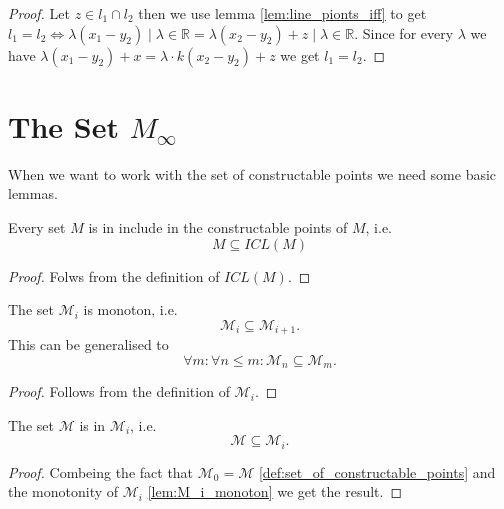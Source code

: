 \begin{proof}
    Let $z\in l_1 \cap l_2$ then we use lemma \ref{lem:line_pionts_iff} to get $l_1 = l_2 \Leftrightarrow {\lambda (x_1-y_2)\mid\lambda\in\mathbb{R}} = {\lambda (x_2- y_2)+z\mid\lambda\in\mathbb{R}}$.
    Since for every $\lambda$ we have $\lambda (x_1-y_2) + x = \lambda \cdot k(x_2- y_2)+z$ we get $l_1 = l_2$.
 \end{proof}

\section[The set of constructable points]{The Set $M_{\infty}$}\label{set_of_constructable_points}
When we want to work with the set of constructable points we need some basic lemmas.

\begin{lemma}
    \label{lem:M_in_ICL_M}
    \leanok
    Every set $M$ is in include in the constructable points of $M$, i.e.
    \[M \subseteq ICL(M)\]
\end{lemma}
\begin{proof}
    Folws from the definition of $ICL(M)$.
\end{proof}

\begin{lemma}
    \label{lem:M_i_monoton}
    \leanok
    The set $\mathcal{M}_i$ is monoton, i.e. $$\mathcal{M}_i \subseteq \mathcal{M}_{i+1}.$$
    This can be generalised to $$\forall m :\forall n\le m : \mathcal{M}_n \subseteq \mathcal{M}_m.$$
\end{lemma}
\begin{proof}
    Follows from the definition of $\mathcal{M}_i$.
\end{proof}

\begin{lemma}
    \label{lem:M_in_Mi}
    \leanok
    The set $\mathcal{M}$ is in $\mathcal{M}_i$, i.e. $$\mathcal{M} \subseteq \mathcal{M}_i.$$
\end{lemma}
\begin{proof}
    Combeing the fact that $\mathcal{M}_0 = \mathcal{M}$ \ref{def:set_of_constructable_points} and the monotonity of $\mathcal{M}_i$ \ref{lem:M_i_monoton} we get the result.
\end{proof}

